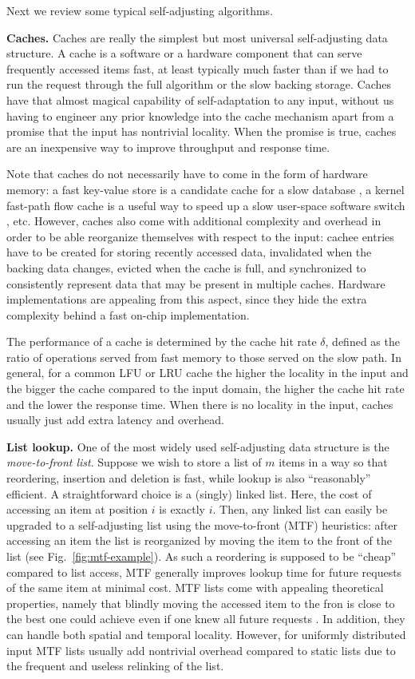 Next we review some typical self-adjusting algorithms.

\noindent%
\textbf{Caches.} %
Caches are really the simplest but most universal self-adjusting data structure. A cache is a software or a hardware component that can serve frequently accessed items fast, at least typically much faster than if we had to run the request through the full algorithm or the slow backing storage. Caches have that almost magical capability of self-adaptation to any input, without us having to engineer any prior knowledge into the cache mechanism apart from a promise that the input has nontrivial locality. When the promise is true, caches are an inexpensive way to improve throughput and response time.

Note that caches do not necessarily have to come in the form of hardware memory: a fast key-value store is a candidate cache for a slow database \cite{10.5555/1012889.1012894}, a kernel fast-path flow cache is a useful way to speed up a slow user-space software switch \cite{188960}, etc. However, caches also come with additional complexity and overhead in order to be able reorganize themselves with respect to the input: cachee entries have to be created for storing recently accessed data, invalidated when the backing data changes, evicted when the cache is full, and synchronized to consistently represent data that may be present in multiple caches. Hardware implementations are appealing from this aspect, since they hide the extra complexity behind a fast on-chip implementation.

The performance of a cache is determined by the cache hit rate $\delta$, defined as the ratio of operations served from fast memory to those served on the slow path. In general, for a common LFU or LRU cache the higher the locality in the input and the bigger the cache compared to the input domain, the higher the cache hit rate and the lower the response time. When there is no locality in the input, caches usually just add extra latency and overhead.

\noindent%
\textbf{List lookup.} %
One of the most widely used self-adjusting data structure is the \emph{move-to-front list}. Suppose we wish to store a list of $m$ items in a way so that reordering, insertion and deletion is fast, while lookup is also ``reasonably'' efficient. A straightforward choice is a (singly) linked list. Here, the cost of accessing an item at position $i$ is exactly $i$. Then, any linked list can easily be upgraded to a self-adjusting list using the move-to-front (MTF) heuristics: after accessing an item the list is reorganized by moving the item to the front of the list (see Fig.~\ref{fig:mtf-example}). As such a reordering is supposed to be ``cheap'' compared to list access, MTF generally improves lookup time for future requests of the same item at minimal cost. MTF lists come with appealing theoretical properties, namely that blindly moving the accessed item to the fron is close to the best one could achieve even if one knew all future requests \cite{SleatorT85}. In addition, they can handle both spatial and temporal locality. However, for uniformly distributed input MTF lists usually add nontrivial overhead compared to static lists due to the frequent and useless relinking of the list.

